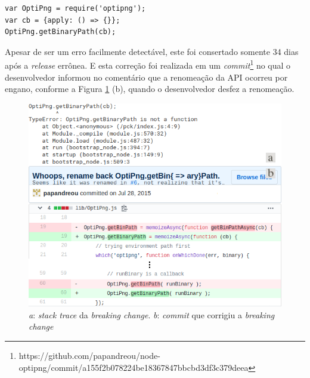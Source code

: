 \begin{lstlisting}[style=Javascript, label=cod:bc:optipng, caption={Código que sofre \textit{breaking change} do \textit{optipng}}]
var OptiPng = require('optipng');
var cb = {apply: () => {}};
OptiPng.getBinaryPath(cb);
\end{lstlisting}

Apesar de ser um erro facilmente detectável, este foi consertado somente 34 dias após a \textit{release} errônea. E esta correção foi realizada em um \textit{commit}\footnote{https://github.com/papandreou/node-optipng/commit/a155f2b078224be18367847bbcbd3df3c379deea} no qual o desenvolvedor informou no comentário que a renomeação da \gls{API} ocorreu por engano, conforme a Figura \ref{fig:bc_optipng} (b), quando o desenvolvedor desfez a renomeação.

\begin{figure}
    \centering
    \includegraphics[scale=0.65]{figuras/bc_optipng.png}
    \caption{\textit{a}: \textit{stack trace} da \textit{breaking change}. \textit{b}: \textit{commit} que corrigiu a \textit{breaking change}}
    \label{fig:bc_optipng}
\end{figure}{}

